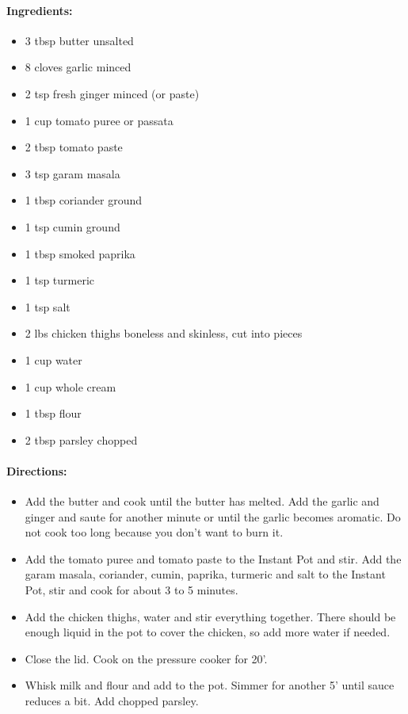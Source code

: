 \documentclass{article}
\begin{document}
\paragraph{Ingredients:}
\begin{itemize}
	\item 3 tbsp butter unsalted
	\item 8 cloves garlic minced
	\item 2 tsp fresh ginger minced (or paste)
	\item 1 cup tomato puree or passata
	\item 2 tbsp tomato paste
	\item 3 tsp garam masala
	\item 1 tbsp coriander ground
	\item 1 tsp cumin ground
	\item 1 tbsp smoked paprika
	\item 1 tsp turmeric
	\item 1 tsp salt
	\item 2 lbs chicken thighs boneless and skinless, cut into pieces
	\item 1 cup water
	\item 1 cup whole cream
	\item 1 tbsp flour
	\item 2 tbsp parsley chopped	
\end{itemize}

\paragraph{Directions:}
\begin{itemize}
	\item Add the butter and cook until the butter has melted. Add the garlic and ginger and saute for another minute or until the garlic becomes aromatic. Do not cook too long because you don’t want to burn it.
	\item Add the tomato puree and tomato paste to the Instant Pot and stir. Add the garam masala, coriander, cumin, paprika, turmeric and salt to the Instant Pot, stir and cook for about 3 to 5 minutes.
	\item Add the chicken thighs, water and stir everything together. There should be enough liquid in the pot to cover the chicken, so add more water if needed.
	\item Close the lid. Cook on the pressure cooker for 20’.
	\item Whisk milk and flour and add to the pot. Simmer for another 5’ until sauce reduces a bit. Add chopped parsley.	
\end{itemize}
\end{document}
